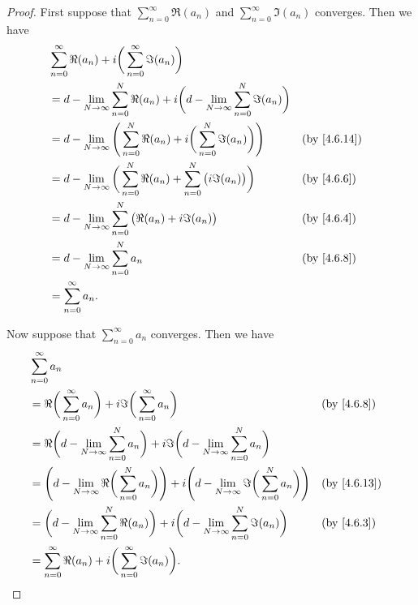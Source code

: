 \begin{proof}
  First suppose that \(\sum_{n = 0}^\infty \Re(a_n)\) and \(\sum_{n = 0}^\infty \Im(a_n)\) converges.
  Then we have
  \begin{align*}
     & \sum_{n = 0}^\infty \Re(a_n) + i \bigg(\sum_{n = 0}^\infty \Im(a_n)\bigg)                                                                        \\
     & = d - \lim_{N \to \infty} \sum_{n = 0}^N \Re(a_n) + i \bigg(d - \lim_{N \to \infty} \sum_{n = 0}^N \Im(a_n)\bigg)                                \\
     & = d - \lim_{N \to \infty} \Bigg(\sum_{n = 0}^N \Re(a_n) + i \bigg(\sum_{n = 0}^N \Im(a_n)\bigg)\Bigg)             &  & \text{(by \cref{4.6.14})} \\
     & = d - \lim_{N \to \infty} \bigg(\sum_{n = 0}^N \Re(a_n) + \sum_{n = 0}^N \big(i \Im(a_n)\big)\bigg)               &  & \text{(by \cref{4.6.6})}  \\
     & = d - \lim_{N \to \infty} \sum_{n = 0}^N \big(\Re(a_n) + i \Im(a_n)\big)                                          &  & \text{(by \cref{4.6.4})}  \\
     & = d - \lim_{N \to \infty} \sum_{n = 0}^N a_n                                                                      &  & \text{(by \cref{4.6.8})}  \\
     & = \sum_{n = 0}^\infty a_n.
  \end{align*}

  Now suppose that \(\sum_{n = 0}^\infty a_n\) converges.
  Then we have
  \begin{align*}
     & \sum_{n = 0}^\infty a_n                                                                                                                                                          \\
     & = \Re\bigg(\sum_{n = 0}^\infty a_n\bigg) + i \Im\bigg(\sum_{n = 0}^\infty a_n\bigg)                                                               &  & \text{(by \cref{4.6.8})}  \\
     & = \Re\bigg(d - \lim_{N \to \infty} \sum_{n = 0}^N a_n\bigg) + i \Im\bigg(d - \lim_{N \to \infty} \sum_{n = 0}^N a_n\bigg)                                                        \\
     & = \Bigg(d - \lim_{N \to \infty} \Re\bigg(\sum_{n = 0}^N a_n\bigg)\Bigg) + i \Bigg(d - \lim_{N \to \infty} \Im\bigg(\sum_{n = 0}^N a_n\bigg)\Bigg) &  & \text{(by \cref{4.6.13})} \\
     & = \bigg(d - \lim_{N \to \infty} \sum_{n = 0}^N \Re(a_n)\bigg) + i \bigg(d - \lim_{N \to \infty} \sum_{n = 0}^N \Im(a_n)\bigg)                     &  & \text{(by \cref{4.6.3})}  \\
     & = \sum_{n = 0}^\infty \Re(a_n) + i \bigg(\sum_{n = 0}^\infty \Im(a_n)\bigg).
  \end{align*}
\end{proof}

